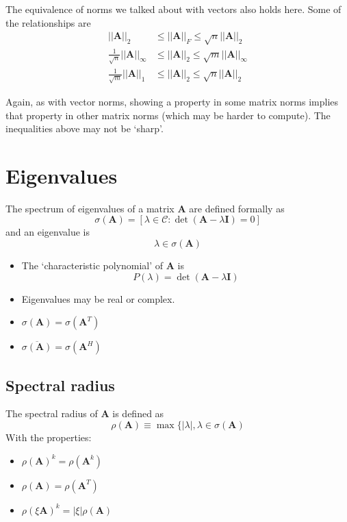 \documentclass[12pt]{article}
\newcommand{\ve}[1]{\ensuremath{\mathbf{#1}}}
\begin{document}
The equivalence of norms we talked about with vectors also holds here. Some of the relationships are
%
\begin{align}
||\ve{A}||_{2} &\leq ||\ve{A}||_{F} \leq \sqrt{n}||\ve{A}||_{2} \nonumber \\
%
\frac{1}{\sqrt{n}}||\ve{A}||_{\infty} &\leq ||\ve{A}||_{2} \leq \sqrt{m}||\ve{A}||_{\infty} \nonumber \\
%
\frac{1}{\sqrt{m}}||\ve{A}||_{1} &\leq ||\ve{A}||_{2} \leq \sqrt{n}||\ve{A}||_{2} \nonumber
\end{align}

Again, as with vector norms, showing a property in some matrix norms implies that property in other matrix norms (which may be harder to compute). The inequalities above may not be `sharp'.

\section{Eigenvalues}

The spectrum of eigenvalues of a matrix $\ve{A}$ are defined formally as
\[\sigma(\ve{A}) = [ \lambda \in \mathcal{C} : \det(\ve{A} - \lambda \ve{I})=0] \] 
and an eigenvalue is 
\[ \lambda \in \sigma(\ve{A}) \]
%
\begin{itemize}
\item The `characteristic polynomial' of $\ve{A}$ is
\[P(\lambda) = \det(\ve{A} - \lambda \ve{I})\]
\item Eigenvalues may be real or complex. 
\item $\sigma(\ve{A}) = \sigma(\ve{A}^T)$
\item $\overline{\sigma(\ve{A})} = \sigma(\ve{A}^H)$
\end{itemize}

\subsection{Spectral radius} 

The spectral radius of $\ve{A}$ is defined as 
\[\rho(\ve{A}) \equiv \max \lbrace |\lambda|, \lambda \in \sigma(\ve{A})\]
With the properties:
%
\begin{itemize}
\item $\rho(\ve{A})^k = \rho(\ve{A}^k)$
\item $\rho(\ve{A}) = \rho(\ve{A}^T)$
\item $\rho(\xi \ve{A})^k = |\xi| \rho(\ve{A})$
\end{itemize}
\end{document}

